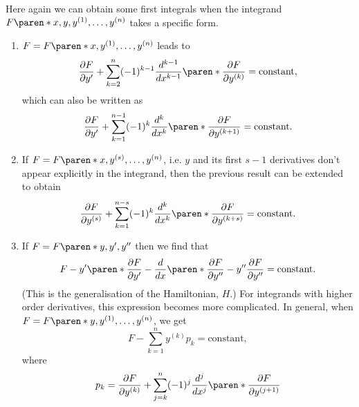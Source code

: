 \documentclass[11pt]{penrose}
\begin{document}
Here again we can obtain some first integrals when the integrand $F\paren*{x, y, y^{(1)}, \dots, y^{(n)}}$ takes a specific form.
\begin{enumerate}
    \item $F = F\paren*{x, y^{(1)}, \dots, y^{(n)}}$ leads to
    \begin{equation}
        \frac{\pd F}{\pd y'} + \sum_{k=2}^{n} (-1)^{k-1} \frac{d^{k-1}}{dx^{k-1}} \paren*{\frac{\pd F}{\pd y^{(k)}}}
        = \text{constant},
    \end{equation}
    which can also be written as
    \begin{equation}
        \frac{\pd F}{\pd y'} + \sum_{k=1}^{n-1} (-1)^{k} \frac{d^{k}}{dx^{k}} \paren*{\frac{\pd F}{\pd y^{(k+1)}}}
        = \text{constant}.
    \end{equation}

    \item If $F = F\paren*{x, y^{(s)}, \dots, y^{(n)}}$, i.e. $y$ and its first $s-1$ derivatives don't appear explicitly in the integrand, then the previous result can be extended to obtain
    \begin{equation}
        \frac{\pd F}{\pd y^{(s)}}
        + \sum_{k=1}^{n-s} (-1)^{k} \frac{d^{k}}{dx^{k}} \paren*{\frac{\pd F}{\pd y^{(k+s)}}}
        = \text{constant}.
    \end{equation}

    \item If $F = F\paren*{y, y', y''}$ then we find that
    \begin{equation}
        F - y' \paren*{\frac{\pd F}{\pd y'} - \frac{d}{dx}\paren*{\frac{\pd F}{\pd y''}}} - y'' \frac{\pd F}{\pd y''}
        = \text{constant}.
    \end{equation}
    (This is the generalisation of the Hamiltonian, $H$.) For integrands with higher order derivatives, this expression becomes more complicated. In general, when $F = F\paren*{y, y^{(1)}, \dots, y^{(n)}}$, we get
    \begin{equation}
        F - \sum_{k=1}^{n} y^{(k)} p_{k} = \text{constant},
    \end{equation}
    where
    \begin{equation}
        p_k = \frac{\pd F}{\pd y^{(k)}}
        + \sum_{j=k}^{n} (-1)^{j} \frac{d^{j}}{dx^{j}} \paren*{ \frac{\pd F}{\pd y^{(j+1)}} }
    \end{equation}
\end{enumerate}
\end{document}
